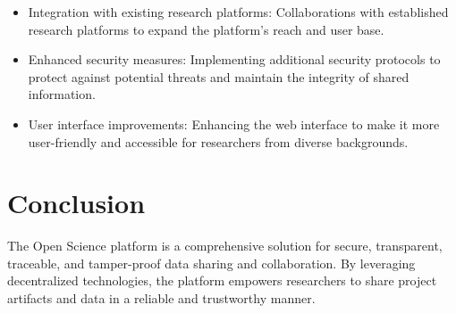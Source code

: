 \documentclass{article}
\begin{document}
\begin{itemize}
      \item Integration with existing research platforms: Collaborations with established research platforms to expand the platform's reach and user base.
      \item Enhanced security measures: Implementing additional security protocols to protect against potential threats and maintain the integrity of shared information.
      \item User interface improvements: Enhancing the web interface to make it more user-friendly and accessible for researchers from diverse backgrounds.
\end{itemize}

\section{Conclusion}
The Open Science platform is a comprehensive solution for secure, transparent, traceable, and tamper-proof data sharing and collaboration. By leveraging decentralized technologies, the platform empowers researchers to share project artifacts and data in a reliable and trustworthy manner.
\end{document}
